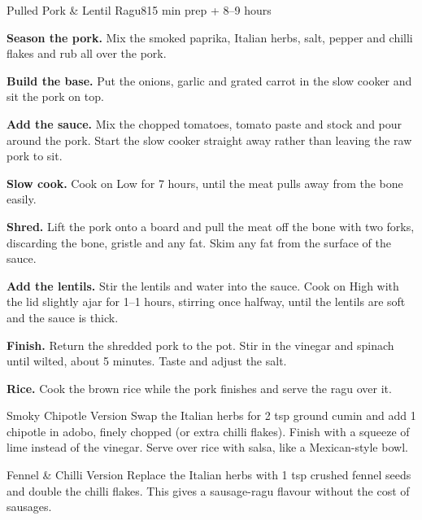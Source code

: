 \begin{recipebox}{Pulled Pork \& Lentil Ragu}{8}{15 min prep + 8--9 hours}
\begin{method}
  \item \textbf{Season the pork.} Mix the smoked paprika, Italian herbs, salt,
        pepper and chilli flakes and rub all over the pork.
  \item \textbf{Build the base.} Put the onions, garlic and grated carrot in the
        slow cooker and sit the pork on top.
  \item \textbf{Add the sauce.} Mix the chopped tomatoes, tomato paste and stock
        and pour around the pork. Start the slow cooker straight away rather
        than leaving the raw pork to sit.
  \item \textbf{Slow cook.} Cook on Low for 7 hours, until the meat pulls away
        from the bone easily.
  \item \textbf{Shred.} Lift the pork onto a board and pull the meat off the bone
        with two forks, discarding the bone, gristle and any fat. Skim any fat
        from the surface of the sauce.
  \item \textbf{Add the lentils.} Stir the lentils and water into the sauce. Cook
        on High with the lid slightly ajar for 1--1 hours,
        stirring once halfway, until the lentils are soft and the sauce is thick.
  \item \textbf{Finish.} Return the shredded pork to the pot. Stir in the vinegar
        and spinach until wilted, about 5 minutes. Taste and adjust the salt.
  \item \textbf{Rice.} Cook the brown rice while the pork finishes and serve the
        ragu over it.
\end{method}

\begin{variationbox}{Smoky Chipotle Version}
Swap the Italian herbs for 2 tsp ground cumin and add 1 chipotle in adobo,
finely chopped (or extra chilli flakes). Finish with a squeeze of lime instead
of the vinegar. Serve over rice with salsa, like a Mexican-style bowl.
\end{variationbox}

\begin{variationbox}{Fennel \& Chilli Version}
Replace the Italian herbs with 1 tsp crushed fennel seeds and double the chilli
flakes. This gives a sausage-ragu flavour without the cost of sausages.
\end{variationbox}


\end{recipebox}
